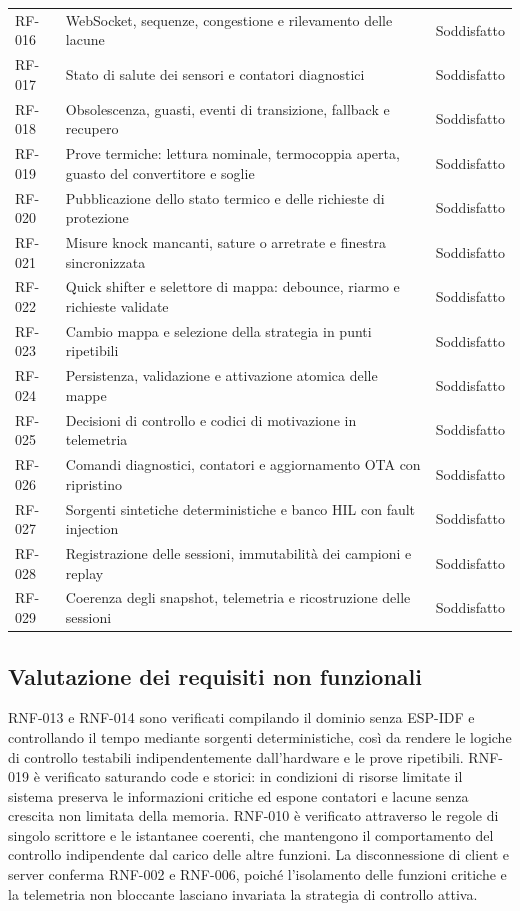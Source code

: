 \documentclass{article}
\begin{document}
{\begin{longtable}{p{} p{} p{}}
RF-016 & WebSocket, sequenze, congestione e rilevamento delle lacune & Soddisfatto \\
RF-017 & Stato di salute dei sensori e contatori diagnostici & Soddisfatto \\
RF-018 & Obsolescenza, guasti, eventi di transizione, fallback e recupero & Soddisfatto \\
RF-019 & Prove termiche: lettura nominale, termocoppia aperta, guasto del convertitore e soglie & Soddisfatto \\
RF-020 & Pubblicazione dello stato termico e delle richieste di protezione & Soddisfatto \\
RF-021 & Misure knock mancanti, sature o arretrate e finestra sincronizzata & Soddisfatto \\
RF-022 & Quick shifter e selettore di mappa: debounce, riarmo e richieste validate & Soddisfatto \\
RF-023 & Cambio mappa e selezione della strategia in punti ripetibili & Soddisfatto \\
RF-024 & Persistenza, validazione e attivazione atomica delle mappe & Soddisfatto \\
RF-025 & Decisioni di controllo e codici di motivazione in telemetria & Soddisfatto \\
RF-026 & Comandi diagnostici, contatori e aggiornamento OTA con ripristino & Soddisfatto \\
RF-027 & Sorgenti sintetiche deterministiche e banco HIL con fault injection & Soddisfatto \\
RF-028 & Registrazione delle sessioni, immutabilità dei campioni e replay & Soddisfatto \\
RF-029 & Coerenza degli snapshot, telemetria e ricostruzione delle sessioni & Soddisfatto \\
\end{longtable}
}

\subsection{Valutazione dei requisiti non funzionali}

RNF-013 e RNF-014 sono verificati compilando il dominio senza ESP-IDF e
controllando il tempo mediante sorgenti deterministiche, così da rendere le
logiche di controllo testabili indipendentemente dall'hardware e le prove
ripetibili. RNF-019 è verificato saturando code e storici: in condizioni di
risorse limitate il sistema preserva le informazioni critiche ed espone contatori
e lacune senza crescita non limitata della memoria. RNF-010 è verificato
attraverso le regole di singolo scrittore e le istantanee coerenti, che mantengono
il comportamento del controllo indipendente dal carico delle altre funzioni. La
disconnessione di client e server conferma RNF-002 e RNF-006, poiché l'isolamento
delle funzioni critiche e la telemetria non bloccante lasciano invariata la
strategia di controllo attiva.
\end{document}
